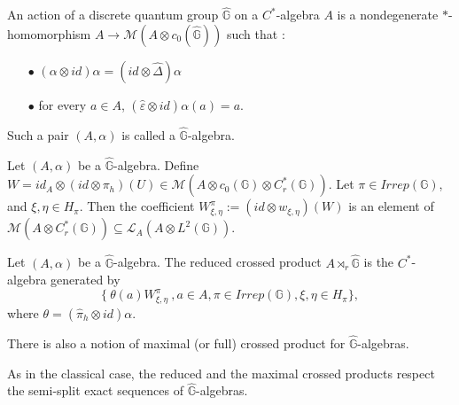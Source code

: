 

\begin{definition} An action of a discrete quantum group $\hat{\mathbb G}$ on a $C^*$-algebra $A$ is a nondegenerate $*$-homomorphism $A\rightarrow \mathcal M(A\otimes c_0(\hat{\mathbb G}))$ such that :
\begin{itemize}
\item[$\bullet$] $(\alpha \otimes id )\alpha = (id\otimes \hat\Delta) \alpha$
\item[$\bullet$] for every $a\in A$, $(\hat\varepsilon \otimes id)\alpha(a) = a$.
\end{itemize}
Such a pair $(A,\alpha)$ is called a $\hat{\mathbb G}$-algebra.
\end{definition}

Let $(A,\alpha)$ be a $\hat{\mathbb G}$-algebra. Define $W= id_A \otimes (id\otimes\pi_h)(U) \in \mathcal M (A\otimes c_0(\mathbb G)\otimes C^*_r(\mathbb G))  $. Let $\pi\in Irrep(\mathbb G)$, and $\xi,\eta \in H_\pi$. Then the coefficient $W^\pi_{\xi,\eta}:=(id\otimes w_{\xi,\eta})(W)$ is an element of $\mathcal M(A\otimes C_r^*(\mathbb G)) \subseteq \mathcal L_A(A\otimes L^2(\mathbb G))$. 

\begin{definition} Let $(A,\alpha)$ be a $\hat{\mathbb G}$-algebra. The reduced crossed product $A\rtimes_r \hat{\mathbb G}$ is the $C^*$-algebra generated by 
\[\{\ \theta(a)W^\pi_{\xi,\eta}\ , a\in A , \pi\in Irrep(\mathbb G),\xi,\eta\in H_\pi\},\]
where $\theta = (\hat\pi_h \otimes id)\alpha$.  
\end{definition}

\begin{rk}
There is also a notion of maximal (or full) crossed product for $\hat{\mathbb G}$-algebras.
\end{rk}

\begin{rk}
As in the classical case, the reduced and the maximal crossed products respect the semi-split exact sequences of $\hat{\mathbb G}$-algebras.
\end{rk}

